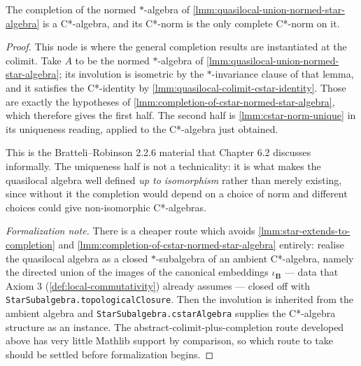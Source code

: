 \begin{lemma}
    \label{lmm:quasilocal-completion-cstar}
    The completion of the normed $*$-algebra of \ref{lmm:quasilocal-union-normed-star-algebra} is a C*-algebra, and its C*-norm is the only complete C*-norm on it.
\end{lemma}
\begin{proof}
    This node is where the general completion results are instantiated at the colimit. Take $A$ to be the normed $*$-algebra of \ref{lmm:quasilocal-union-normed-star-algebra}; its involution is isometric by the $*$-invariance clause of that lemma, and it satisfies the C*-identity by \ref{lmm:quasilocal-colimit-cstar-identity}. Those are exactly the hypotheses of \ref{lmm:completion-of-cstar-normed-star-algebra}, which therefore gives the first half. The second half is \ref{lmm:cstar-norm-unique} in its uniqueness reading, applied to the C*-algebra just obtained.

    This is the Bratteli--Robinson 2.2.6 material that Chapter 6.2 discusses informally. The uniqueness half is not a technicality: it is what makes the quasilocal algebra well defined \emph{up to isomorphism} rather than merely existing, since without it the completion would depend on a choice of norm and different choices could give non-isomorphic C*-algebras.

    \emph{Formalization note.} There is a cheaper route which avoids \ref{lmm:star-extends-to-completion} and \ref{lmm:completion-of-cstar-normed-star-algebra} entirely: realise the quasilocal algebra as a closed $*$-subalgebra of an ambient C*-algebra, namely the directed union of the images of the canonical embeddings $\iota_{\mathbf{B}}$ --- data that Axiom 3 (\ref{def:local-commutativity}) already assumes --- closed off with \texttt{StarSubalgebra.topologicalClosure}. Then the involution is inherited from the ambient algebra and \texttt{StarSubalgebra.cstarAlgebra} supplies the C*-algebra structure as an instance. The abstract-colimit-plus-completion route developed above has very little Mathlib support by comparison, so which route to take should be settled before formalization begins.
\end{proof}

